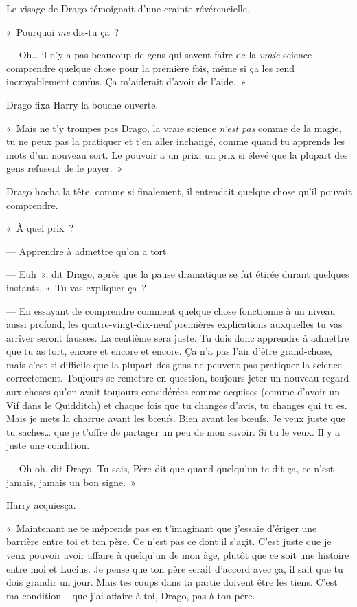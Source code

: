 Le visage de Drago témoignait d'une crainte révérencielle.

«~Pourquoi \emph{me} dis-tu ça~?

--- Oh… il n'y a pas beaucoup de gens qui savent faire de la \emph{vraie} science -- comprendre quelque chose pour la première fois, même si ça les rend incroyablement confus. Ça m'aiderait d'avoir de l'aide.~»

Drago fixa Harry la bouche ouverte.

«~Mais ne t'y trompes pas Drago, la vraie science \emph{n'est pas} comme de la magie, tu ne peux pas la pratiquer et t'en aller inchangé, comme quand tu apprends les mots d'un nouveau sort. Le pouvoir a un prix, un prix si élevé que la plupart des gens refusent de le payer.~»

Drago hocha la tête, comme si finalement, il entendait quelque chose qu'il pouvait comprendre.

«~À quel prix~?

--- Apprendre à admettre qu'on a tort.

--- Euh~», dit Drago, après que la pause dramatique se fut étirée durant quelques instants. «~Tu vas expliquer ça~?

--- En essayant de comprendre comment quelque chose fonctionne à un niveau aussi profond, les quatre-vingt-dix-neuf premières explications auxquelles tu vas arriver seront fausses. La centième sera juste. Tu dois donc apprendre à admettre que tu as tort, encore et encore et encore. Ça n'a pas l'air d'être grand-chose, mais c'est si difficile que la plupart des gens ne peuvent pas pratiquer la science correctement. Toujours se remettre en question, toujours jeter un nouveau regard aux choses qu'on avait toujours considérées comme acquises (comme d'avoir un Vif dans le Quidditch) et chaque fois que tu changes d'avis, tu changes qui tu es. Mais je mets la charrue avant les bœufs. Bien avant les bœufs. Je veux juste que tu saches… que je t'offre de partager un peu de mon savoir. Si tu le veux. Il y a juste une condition.

--- Oh oh, dit Drago. Tu sais, Père dit que quand quelqu'un te dit ça, ce n'est jamais, jamais un bon signe.~»

Harry acquiesça.

«~Maintenant ne te méprends pas en t'imaginant que j'essaie d'ériger une barrière entre toi et ton père. Ce n'est pas ce dont il s'agit. C'est juste que je veux pouvoir avoir affaire à quelqu'un de mon âge, plutôt que ce soit une histoire entre moi et Lucius. Je pense que ton père serait d'accord avec ça, il sait que tu dois grandir un jour. Mais tes coups dans ta partie doivent être les tiens. C'est ma condition -- que j'ai affaire à toi, Drago, pas à ton père.

